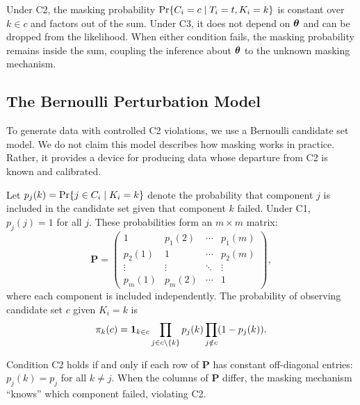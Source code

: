 Under C2, the masking probability $\mathrm{Pr}\{C_i = c \mid T_i = t, K_i = k\}$ is
constant over $k \in c$ and factors out of the sum. Under C3, it does not
depend on $\bm{\theta}$ and can be dropped from the likelihood. When either
condition fails, the masking probability remains inside the sum, coupling the
inference about $\bm{\theta}$ to the unknown masking mechanism.

\subsection{The Bernoulli Perturbation Model}
\label{sec:bernoulli}

To generate data with controlled C2 violations, we use a Bernoulli candidate
set model. We do not claim this model describes how masking works in practice.
Rather, it provides a device for producing data whose departure from C2 is
known and calibrated.

\begin{definition}
\label{def:bernoulli}
Let $p_j(k) = \mathrm{Pr}\{j \in C_i \mid K_i = k\}$ denote the probability that
component $j$ is included in the candidate set given that component $k$
failed. Under C1, $p_j(j) = 1$ for all $j$. These probabilities form an
$m \times m$ matrix:
\begin{equation}
\label{eq:P-matrix}
    \mathbf{P} = \begin{pmatrix}
        1 & p_1(2) & \cdots & p_1(m) \\
        p_2(1) & 1 & \cdots & p_2(m) \\
        \vdots & \vdots & \ddots & \vdots \\
        p_m(1) & p_m(2) & \cdots & 1
    \end{pmatrix},
\end{equation}
where each component is included independently. The probability of observing
candidate set $c$ given $K_i = k$ is
\begin{equation}
\label{eq:pi-k-c}
    \pi_k(c) = \mathbf{1}_{k \in c} \prod_{j \in c \setminus \{k\}} p_j(k)
    \prod_{j \notin c} (1 - p_j(k)).
\end{equation}
\end{definition}

\begin{remark}
\label{rem:C2-P}
Condition C2 holds if and only if each row of $\mathbf{P}$ has constant
off-diagonal entries: $p_j(k) = p_j$ for all $k \neq j$. When the columns of
$\mathbf{P}$ differ, the masking mechanism ``knows'' which component failed,
violating C2.
\end{remark}

